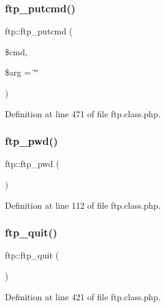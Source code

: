 \hypertarget{classftp_a77dcfe6900e85bbd3c22308123905eee}{}\label{classftp_a77dcfe6900e85bbd3c22308123905eee} 
\subsubsection{\texorpdfstring{ftp\+\_\+putcmd()}{ftp\_putcmd()}}
{\footnotesize\ttfamily ftp\+::ftp\+\_\+putcmd (\begin{DoxyParamCaption}\item[{}]{\$cmd,  }\item[{}]{\$arg = {\ttfamily \char`\"{}\char`\"{}} }\end{DoxyParamCaption})}



Definition at line 471 of file ftp.\+class.\+php.

\hypertarget{classftp_ab4e7d0619162897f11fe1d53b2edf477}{}\label{classftp_ab4e7d0619162897f11fe1d53b2edf477} 
\subsubsection{\texorpdfstring{ftp\+\_\+pwd()}{ftp\_pwd()}}
{\footnotesize\ttfamily ftp\+::ftp\+\_\+pwd (\begin{DoxyParamCaption}{ }\end{DoxyParamCaption})}



Definition at line 112 of file ftp.\+class.\+php.

\hypertarget{classftp_a993db0725e312a4c202d6b1c84780df3}{}\label{classftp_a993db0725e312a4c202d6b1c84780df3} 
\subsubsection{\texorpdfstring{ftp\+\_\+quit()}{ftp\_quit()}}
{\footnotesize\ttfamily ftp\+::ftp\+\_\+quit (\begin{DoxyParamCaption}{ }\end{DoxyParamCaption})}



Definition at line 421 of file ftp.\+class.\+php.

\hypertarget{classftp_a67e63d6ca3a1b9d6d633b020f1ff6d05}{}\label{classftp_a67e63d6ca3a1b9d6d633b020f1ff6d05} 
